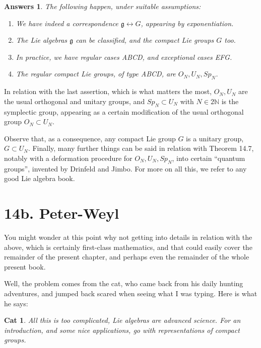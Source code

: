 \documentclass[12pt]{amsbook}
\newtheorem{answers}[theorem]{Answers}
\newtheorem{cat}[theorem]{Cat}
\begin{document}
\begin{answers}
The following happen, under suitable assumptions:
\begin{enumerate}
\item We have indeed a correspondence $\mathfrak g\leftrightarrow G$, appearing by exponentiation.

\item The Lie algebras $\mathfrak g$ can be classified, and the compact Lie groups $G$ too.

\item In practice, we have regular cases ABCD, and exceptional cases EFG.

\item The regular compact Lie groups, of type ABCD, are $O_N,U_N,Sp_N$.
\end{enumerate}
\end{answers}

In relation with the last assertion, which is what matters the most, $O_N,U_N$ are the usual orthogonal and unitary groups, and $Sp_N\subset U_N$ with $N\in2\mathbb N$ is the symplectic group, appearing as a certain modification of the usual orthogonal group $O_N\subset U_N$.

\bigskip

Observe that, as a consequence, any compact Lie group $G$ is a unitary group, $G\subset U_N$. Finally, many further things can be said in relation with Theorem 14.7, notably with a deformation procedure for $O_N,U_N,Sp_N$, into certain ``quantum groups'', invented by Drinfeld and Jimbo. For more on all this, we refer to any good Lie algebra book.

\section*{14b. Peter-Weyl}

You might wonder at this point why not getting into details in relation with the above, which is certainly first-class mathematics, and that could easily cover the remainder of the present chapter, and perhaps even the remainder of the whole present book.

\bigskip

Well, the problem comes from the cat, who came back from his daily hunting adventures, and jumped back scared when seeing what I was typing. Here is what he says:

\begin{cat}
All this is too complicated, Lie algebras are advanced science. For an introduction, and some nice applications, go with representations of compact groups.
\end{cat}
\end{document}
